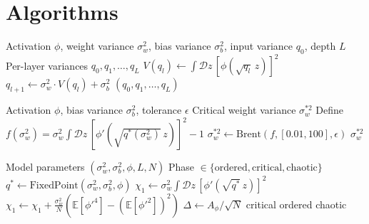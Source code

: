 \documentclass[10pt]{article}
\newcommand{\EE}{\mathbb{E}}
\begin{document}
\section{Algorithms}
\label{app:algorithms}

\begin{algorithm}[H]
\caption{Variance Map Computation}
\label{alg:variance-map}
\begin{algorithmic}[1]
\Require Activation $\phi$, weight variance $\sigma_w^2$, bias variance $\sigma_b^2$, input variance $q_0$, depth $L$
\Ensure Per-layer variances $q_0, q_1, \ldots, q_L$
    \State $V(q_l) \gets \int \mathcal{D}z\, [\phi(\sqrt{q_l}\, z)]^2$ 
    \State $q_{l+1} \gets \sigma_w^2 \cdot V(q_l) + \sigma_b^2$
\EndFor
\State \Return $(q_0, q_1, \ldots, q_L)$
\end{algorithmic}
\end{algorithm}

\begin{algorithm}[H]
\caption{Edge-of-Chaos Solver}
\label{alg:eoc-solver}
\begin{algorithmic}[1]
\Require Activation $\phi$, bias variance $\sigma_b^2$, tolerance $\epsilon$
\Ensure Critical weight variance $\sigma_w^{*2}$
\State Define $f(\sigma_w^2) = \sigma_w^2 \int \mathcal{D}z\, [\phi'(\sqrt{q^*(\sigma_w^2)}\, z)]^2 - 1$
\State $\sigma_w^{*2} \gets \text{Brent}(f, [0.01, 100], \epsilon)$
\State \Return $\sigma_w^{*2}$
\end{algorithmic}
\end{algorithm}

\begin{algorithm}[H]
\caption{Phase Classification}
\label{alg:classify}
\begin{algorithmic}[1]
\Require Model parameters $(\sigma_w^2, \sigma_b^2, \phi, L, N)$
\Ensure Phase $\in \{\text{ordered}, \text{critical}, \text{chaotic}\}$
\State $q^* \gets \text{FixedPoint}(\sigma_w^2, \sigma_b^2, \phi)$
\State $\chi_1 \gets \sigma_w^2 \int \mathcal{D}z\, [\phi'(\sqrt{q^*}\, z)]^2$
    \State $\chi_1 \gets \chi_1 + \frac{\sigma_w^2}{N}(\EE[\phi'^4] - (\EE[\phi'^2])^2)$ 
\EndIf
\State $\Delta \gets A_\phi / \sqrt{N}$ 
    \State \Return critical
    \State \Return ordered
\Else
    \State \Return chaotic
\EndIf
\end{algorithmic}
\end{algorithm}
\end{document}
